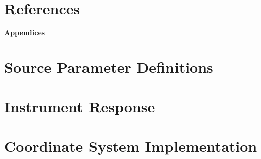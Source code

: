 \documentclass[12pt]{article}
\begin{document}
\newpage
\clearpage
\printglossary[type=\acronymtype,title=List of Acronyms]

\newpage
\section{References}

\newpage
\begin{titlepage}
  \centering
  \vspace*{4cm}
  \textbf{\Large Appendices}
  \vfill
\end{titlepage}

\newpage
\appendix
\section{Source Parameter Definitions}


\section{Instrument Response}


\section{Coordinate System Implementation}


\end{document}
